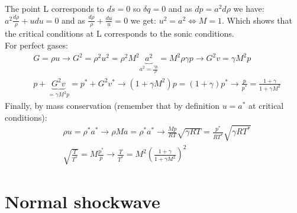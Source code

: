 The point L corresponds to $ds=0$ so $\delta q=0$ and as $dp=a^2d\rho$ we have: $a^2\frac{d\rho}{\rho}+udu=0$ and as  $\frac{d\rho}{\rho}+\frac{du}{u}=0$ we get: $u^2=a^2 \Leftrightarrow M=1$. Which shows that the critical conditions at L corresponds to the sonic conditions.
\\

For perfect gases:
 \begin{equation}
\begin{aligned}
& G=\rho u \rightarrow G^2=\rho^2 u^2=\rho^2 M^2 \underbrace{a^2}_{a^2=\frac{\gamma p}{\rho}} =M^2 \rho \gamma p \rightarrow G^2v=\gamma M^2p \\ 
&p+\underbrace{G^2v}_{=\gamma M^2p}=p^*+G^2v^* \rightarrow (1+\gamma M^2)p=(1+\gamma)p^*
 \rightarrow \frac{p}{p^*}=\frac{1+ \gamma
 }{1+ \gamma M^2}
\end{aligned} 
\end{equation}
Finally, by mass conservation (remember that by definition $u=a^*$ at critical conditions):
 \begin{equation}
\begin{aligned}
&\rho u=\rho^* a^* \rightarrow \rho M a=\rho^* a^* \rightarrow \frac{Mp}{RT} \sqrt{\gamma RT}=\frac{p^*}{RT^*}\sqrt{\gamma RT^*} \\
& \sqrt{\frac{T}{T^*}}=M\frac{p^*}{p} \rightarrow \frac{T}{T^*}=M^2(\frac{1+\gamma}{1+\gamma M^2})^2
\end{aligned} 
\end{equation}

\section{Normal shockwave}

